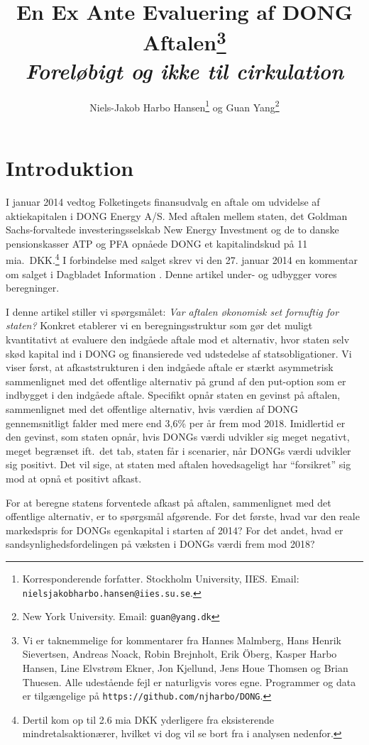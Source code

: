 \documentclass{article}
\title{En Ex Ante Evaluering af DONG Aftalen\thanks{Vi er taknemmelige for kommentarer fra Hannes Malmberg, Hans Henrik Sievertsen, Andreas Noack, Robin Brejnholt, Erik {\"O}berg, Kasper Harbo Hansen, Line Elvstrøm Ekner, Jon Kjellund, Jens Houe Thomsen og Brian Thuesen. Alle udestående fejl er naturligvis vores egne.  Programmer og data er tilgængelige på \texttt{https://github.com/njharbo/DONG}.} \\ \emph{Foreløbigt og ikke til cirkulation}}
\author{Niels-Jakob Harbo Hansen\thanks{Korresponderende forfatter. Stockholm University, IIES.  Email: \texttt{nielsjakobharbo.hansen@iies.su.se}. } \hspace{0.1 mm} og Guan Yang\thanks{New York University.  Email: \texttt{guan@yang.dk}}}
\begin{document}
\maketitle

\newpage

\section{Introduktion}


I januar 2014 vedtog Folketingets finansudvalg en aftale om udvidelse af aktiekapitalen i DONG Energy A/S. Med aftalen mellem staten, det Goldman Sachs-forvaltede investeringsselskab New Energy Investment og de to danske pensionskasser ATP og PFA opnåede DONG et kapitalindskud på 11 mia.\ DKK.\footnote{Dertil kom op til 2.6 mia DKK yderligere fra eksisterende mindretalsaktionærer, hvilket vi dog vil se bort fra i analysen nedenfor.} I forbindelse med salget skrev vi den 27. januar 2014 en kommentar om salget i Dagbladet Information \citep{Hansen2014}. Denne artikel under- og udbygger vores beregninger.

I denne artikel stiller vi spørgsmålet: \emph{Var aftalen økonomisk set fornuftig for staten?} Konkret etablerer vi en beregningsstruktur som gør det muligt kvantitativt at evaluere den indgåede aftale mod et alternativ, hvor staten selv skød kapital ind i DONG og finansierede ved udstedelse af statsobligationer. Vi viser først, at afkaststrukturen i den indgåede aftale er stærkt asymmetrisk sammenlignet med det offentlige alternativ på grund af den put-option som er indbygget i den indgåede aftale. Specifikt opnår staten en gevinst på aftalen, sammenlignet med det offentlige alternativ, hvis værdien af DONG gennemsnitligt falder med mere end 3,6\% per år frem mod 2018. Imidlertid er den gevinst, som staten opnår, hvis DONGs værdi udvikler sig meget negativt, meget begrænset ift.\ det tab, staten får i scenarier, når DONGs værdi udvikler sig positivt. Det vil sige, at staten med aftalen hovedsageligt har \enquote{forsikret} sig mod at opnå et positivt afkast. 

For at beregne statens forventede afkast på aftalen, sammenlignet med det offentlige alternativ, er to spørgsmål afgørende. For det første, hvad var den reale markedspris for DONGs egenkapital i starten af 2014? For det andet, hvad er sandsynlighedsfordelingen på væksten i DONGs værdi frem mod 2018? 
\end{document}
